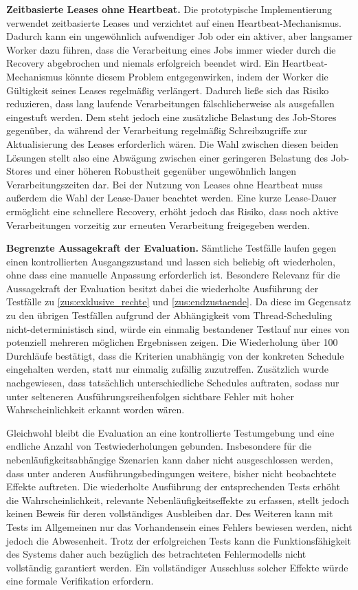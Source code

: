 \textbf{Zeitbasierte Leases ohne Heartbeat.}
Die prototypische Implementierung verwendet zeitbasierte Leases und verzichtet auf einen Heartbeat-Mechanismus.
Dadurch kann ein ungewöhnlich aufwendiger Job oder ein aktiver, aber langsamer Worker dazu führen, dass die Verarbeitung
eines Jobs immer wieder durch die Recovery abgebrochen und niemals erfolgreich beendet wird.
Ein Heartbeat-Mechanismus könnte diesem Problem entgegenwirken, indem der Worker die Gültigkeit seines Leases regelmäßig verlängert.
Dadurch ließe sich das Risiko reduzieren, dass lang laufende Verarbeitungen fälschlicherweise als ausgefallen eingestuft werden.
Dem steht jedoch eine zusätzliche Belastung des Job-Stores gegenüber, da während der Verarbeitung regelmäßig Schreibzugriffe zur
Aktualisierung des Leases erforderlich wären.
Die Wahl zwischen diesen beiden Lösungen stellt also eine Abwägung zwischen einer geringeren Belastung des Job-Stores und einer
höheren Robustheit gegenüber ungewöhnlich langen Verarbeitungszeiten dar.
Bei der Nutzung von Leases ohne Heartbeat muss außerdem die Wahl der Lease-Dauer beachtet werden.
Eine kurze Lease-Dauer ermöglicht eine schnellere Recovery, erhöht jedoch das Risiko, dass noch aktive Verarbeitungen vorzeitig
zur erneuten Verarbeitung freigegeben werden.

\textbf{Begrenzte Aussagekraft der Evaluation.}
Sämtliche Testfälle laufen gegen einen kontrollierten Ausgangszustand und lassen sich
beliebig oft wiederholen, ohne dass eine manuelle Anpassung erforderlich ist.
Besondere Relevanz für die Aussagekraft der Evaluation besitzt dabei die wiederholte Ausführung der Testfälle zu
\ref{zus:exklusive_rechte} und \ref{zus:endzustaende}.
Da diese im Gegensatz zu den übrigen Testfällen aufgrund der Abhängigkeit vom Thread-Scheduling nicht-deterministisch sind,
würde ein einmalig bestandener Testlauf nur eines von potenziell mehreren möglichen Ergebnissen zeigen.
Die Wiederholung über 100 Durchläufe bestätigt, dass die Kriterien unabhängig von der konkreten Schedule eingehalten
werden, statt nur einmalig zufällig zuzutreffen.
Zusätzlich wurde nachgewiesen, dass tatsächlich unterschiedliche Schedules auftraten,
sodass nur unter selteneren Ausführungsreihenfolgen sichtbare Fehler mit hoher Wahrscheinlichkeit erkannt worden wären.

Gleichwohl bleibt die Evaluation an eine kontrollierte Testumgebung und eine endliche Anzahl von Testwiederholungen gebunden.
Insbesondere für die nebenläufigkeitsabhängige Szenarien kann daher nicht ausgeschlossen werden, dass unter anderen Ausführungsbedingungen
weitere, bisher nicht beobachtete Effekte auftreten.
Die wiederholte Ausführung der entsprechenden Tests erhöht die Wahrscheinlichkeit, relevante Nebenläufigkeitseffekte zu erfassen,
stellt jedoch keinen Beweis für deren vollständiges Ausbleiben dar.
Des Weiteren kann mit Tests im Allgemeinen nur das Vorhandensein eines Fehlers bewiesen werden, nicht jedoch die Abwesenheit.
Trotz der erfolgreichen Tests kann die Funktionsfähigkeit des Systems daher auch bezüglich des betrachteten Fehlermodells
nicht vollständig garantiert werden.
Ein vollständiger Ausschluss solcher Effekte würde eine formale Verifikation erfordern.

